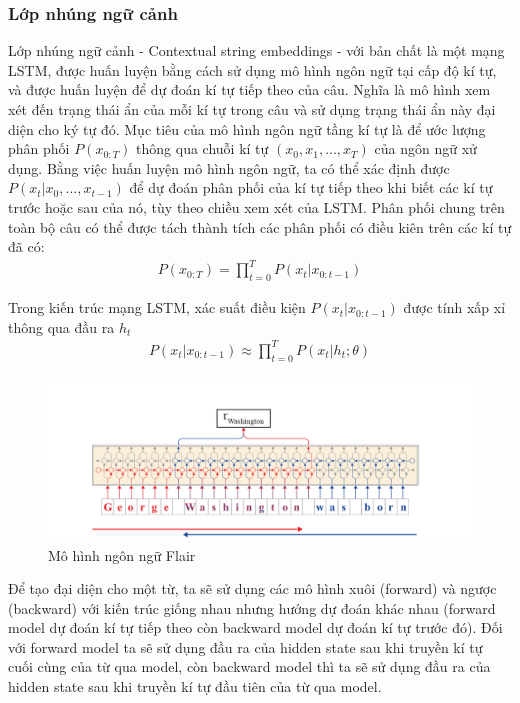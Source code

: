 \documentclass[14pt]{extreport}
\begin{document}
\subsubsection{Lớp nhúng ngữ cảnh }
Lớp nhúng ngữ cảnh - Contextual string embeddings - với bản chất là một mạng LSTM, được huấn luyện bằng cách sử dụng mô hình ngôn ngữ tại cấp độ kí tự, và được huấn luyện để dự đoán kí tự tiếp theo của câu. Nghĩa là mô hình xem xét đến trạng thái ẩn của mỗi kí tự trong câu và sử dụng trạng thái ẩn này đại diện cho ký tự đó.
Mục tiêu của mô hình ngôn ngữ tầng kí tự là để ước lượng phân phối $P(x_{0:T} )$ thông qua chuỗi kí tự $(x_0,x_1,…,x_T )$ của ngôn ngữ xử dụng. Bằng việc huấn luyện mô hình ngôn ngữ, ta có thể xác định được $P(x_t |x_0,…,x_{t-1})$ để dự đoán phân phối của kí tự tiếp theo khi biết các kí tự trước hoặc sau của nó, tùy theo chiều xem xét của LSTM. Phân phối chung trên toàn bộ câu có thể được tách thành tích các phân phối có điều kiên trên các kí tự đã có:
\begin{align*}
    P(x_{0:T} )=\prod_{t=0}^T P(x_t |x_{0:t-1})
\end{align*}

Trong kiến trúc mạng LSTM, xác suất điều kiện $P(x_t |x_{0:t-1})$ được tính xấp xỉ thông qua đầu ra $h_t$
\begin{align*}
    P(x_t |x_{0:t-1}) \approx \prod_{t=0}^T P(x_t |h_t;\theta)
\end{align*}
\begin{figure}[H]
    \centering
    \includegraphics[scale=0.7]{image/flair_lm.PNG}
    \caption{Mô hình ngôn ngữ Flair}
    \label{fig:flair_lm}
\end{figure}
Để tạo đại diện cho một từ, ta sẽ sử dụng các mô hình xuôi (forward)  và ngược (backward) với kiến trúc giống nhau nhưng hướng dự đoán khác nhau (forward model dự đoán kí tự tiếp theo còn backward model dự đoán kí tự trước đó). Đối với forward model ta sẽ sử dụng đầu ra của hidden state sau khi truyền kí tự cuối cùng của từ qua model, còn backward model thì ta sẽ sử dụng đầu ra của hidden state sau khi truyền kí tự đầu tiên của từ qua model.
\end{document}
